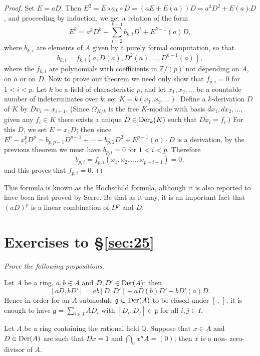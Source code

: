\begin{proof}
Set $E = aD$. Then $E^2 = E \circ a_L \circ D = (aE + E(a))D = a^2D^2 + E(a)D$, and
proceeding by induction, we get a relation of the form
\[
  E^k = a^kD^k + \sum_{i=2}^{k-1} b_{k,i}D^i + E^{k-1}(a)D,
\]
where $b_{k,i}$ are elements of $A$ given by a purely formal computation, so that
\[
  b_{k,i} = f_{k,i}(a, D(a), D^2(a), \ldots, D^{k-1}(a)),
\]
where the $f_{k,i}$ are polynomials with coefficients in $\mathbb{Z}/(p)$ not depending on
$A$, on $a$ or on $D$. Now to prove our theorem we need only show that $f_{p,i} = 0$
for $1 < i < p$. Let $k$ be a field of characteristic $p$, and let $x_1, x_2, \ldots$ be a
countable number of indeterminates over $k$; set $K = k(x_1, x_2, \ldots)$. Define a
$k$-derivation $D$ of $K$ by $Dx_i = x_{i+1}$. (Since $\Omega_{K/k}$ is the free $K$-module with
basis $dx_1, dx_2, \ldots$, given any $f_i \in K$ there exists a unique $D \in \operatorname{Der}_k(K)$
such that $Dx_i = f_i$.) For this $D$, we set $E = x_1D$; then since
$E^p - x_1^pD^p = b_{p,p-1}D^{p-1} + \cdots + b_{p,2}D^2 + E^{p-1}(a) \cdot D$ is a derivation,
by the previous theorem we must have $b_{p,i} = 0$ for $1 < i < p$. Therefore
\[
  b_{p,i} = f_{p,i}(x_1, x_2, \ldots, x_{p-i+1}) = 0,
\]
and this proves that $f_{p,i} = 0$.
\end{proof}

This formula is known as the Hochschild formula, although it is also reported to
have been first proved by Serre. Be that as it may, it is an important fact that
$(aD)^p$ is a linear combination of $D^p$ and $D$.

\section*{Exercises to \S\ref{sec:25}}
\emph{Prove the following propositions.}

\begin{exercise}\label{ex:25.1-ex}
Let $A$ be a ring, $a, b \in A$ and $D, D' \in \operatorname{Der}(A)$; then
\[
  [aD, bD'] = ab[D, D'] + aD(b)D' - bD'(a)D.
\]
Hence in order for an $A$-submodule $\mathfrak{g} \subset \operatorname{Der}(A)$ to be closed under
$[\, , \,]$, it is enough to have $\mathfrak{g} = \sum_{i \in I} AD_i$ with
$[D_i, D_j] \in \mathfrak{g}$ for all $i, j \in I$.
\end{exercise}

\begin{exercise}\label{ex:25.2-ex}
Let $A$ be a ring containing the rational field $\mathbb{Q}$. Suppose that $x \in A$ and
$D \in \operatorname{Der}(A)$ are such that $Dx = 1$ and $\bigcap_{n} x^nA = (0)$; then $x$ is a non-
zero-divisor of $A$.
\end{exercise}


